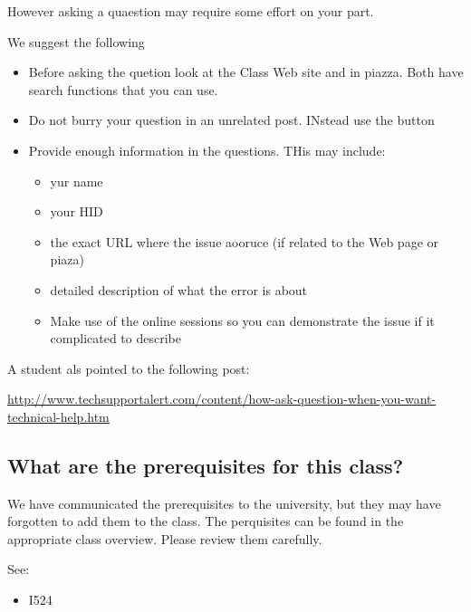 However asking a quaestion may require some effort on your part.

We suggest the following
\begin{itemize}
\item {} 
Before asking the quetion look at the Class Web site and in
piazza. Both have search functions that you can use.

\item {} 
Do not burry your question in an unrelated post. INstead use the
 button

\item {} 
Provide enough information in the questions. THis may include:
\begin{itemize}
\item {} 
yur name

\item {} 
your HID

\item {} 
the exact URL where the issue aooruce (if related to the Web page
or piaza)

\item {} 
detailed description of what the error is about

\item {} 
Make use of the online sessions so you can demonstrate the issue
if it complicated to describe

\end{itemize}

\end{itemize}

A student als pointed to the following post:

\url{http://www.techsupportalert.com/content/how-ask-question-when-you-want-technical-help.htm}


\subsection{What are the prerequisites for this class?}
\label{\detokenize{faq:what-are-the-prerequisites-for-this-class}}
We have communicated the prerequisites to the university, but they may
have forgotten to add them to the class.  The perquisites can be found
in the appropriate class overview. Please review them carefully.

See:
\begin{itemize}
\item {} 
I524 {\hyperref[\detokenize{i524/index:ref-i524-prerequisits}]{}}

\end{itemize}


